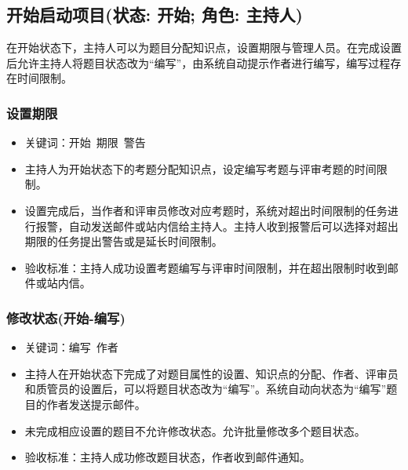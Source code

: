 \documentclass[hyperref, a4paper]{ctexart}
\providecommand{\tightlist}{%
  \setlength{\itemsep}{0pt}\setlength{\parskip}{0pt}}
\begin{document}
\hypertarget{ux5f00ux59cbux542fux52a8ux9879ux76eeux72b6ux6001-ux5f00ux59cb-ux89d2ux8272-ux4e3bux6301ux4eba}{%
\subsection{开始启动项目(状态: 开始; 角色:
主持人)}\label{ux5f00ux59cbux542fux52a8ux9879ux76eeux72b6ux6001-ux5f00ux59cb-ux89d2ux8272-ux4e3bux6301ux4eba}}

在开始状态下，主持人可以为题目分配知识点，设置期限与管理人员。在完成设置后允许主持人将题目状态改为``编写''，由系统自动提示作者进行编写，编写过程存在时间限制。

\hypertarget{ux8bbeux7f6eux671fux9650}{%
\subsubsection{设置期限}\label{ux8bbeux7f6eux671fux9650}}

\begin{itemize}
\tightlist
\item
  关键词：开始~期限~警告
\item
  主持人为开始状态下的考题分配知识点，设定编写考题与评审考题的时间限制。
\item
  设置完成后，当作者和评审员修改对应考题时，系统对超出时间限制的任务进行报警，自动发送邮件或站内信给主持人。主持人收到报警后可以选择对超出期限的任务提出警告或是延长时间限制。
\item
  验收标准：主持人成功设置考题编写与评审时间限制，并在超出限制时收到邮件或站内信。
\end{itemize}

\hypertarget{ux4feeux6539ux72b6ux6001ux5f00ux59cb-ux7f16ux5199}{%
\subsubsection{修改状态(开始-编写)}\label{ux4feeux6539ux72b6ux6001ux5f00ux59cb-ux7f16ux5199}}

\begin{itemize}
\tightlist
\item
  关键词：编写~作者
\item
  主持人在开始状态下完成了对题目属性的设置、知识点的分配、作者、评审员和质管员的设置后，可以将题目状态改为``编写''。系统自动向状态为``编写''题目的作者发送提示邮件。
\item
  未完成相应设置的题目不允许修改状态。允许批量修改多个题目状态。
\item
  验收标准：主持人成功修改题目状态，作者收到邮件通知。
\end{itemize}
\end{document}
